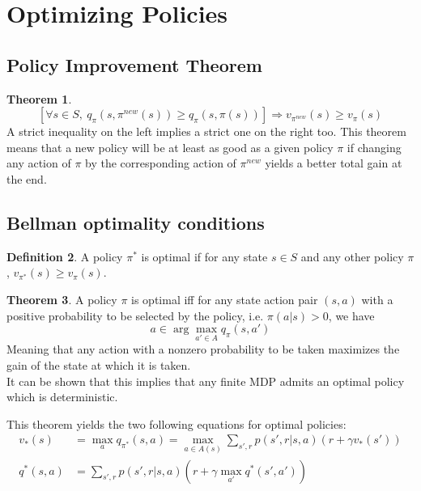 \documentclass[12pt, openany]{report}
\theoremstyle{definition}
\newtheorem{thm}{Theorem}[chapter]
\newtheorem{definition}[thm]{Definition}
\begin{document}
\section{Optimizing Policies}
\subsection{Policy Improvement Theorem}
\begin{thm}
	\begin{equation}
		\left[\forall s\in S,\ q_\pi(s,\pi^{new}(s)) \ge q_\pi(s,\pi(s)) \right] \Longrightarrow v_{\pi^{new}}(s)\ge v_\pi(s)
	\end{equation}
	A strict inequality on the left implies a strict one on the right too. This theorem means that a new policy will be at least as good as a given policy $\pi$ if changing any action of $\pi$ by the corresponding action of $\pi^{new}$ yields a better total gain at the end. 
\end{thm}
\subsection{Bellman optimality conditions}
\begin{definition}
	A policy $\pi^*$ is optimal if for any state $s \in S$ and any other policy $\pi$, $v_{\pi^*}(s)\ge v_\pi (s)$.
\end{definition}
\begin{thm}
	A policy $\pi$ is optimal iff for any state action pair $(s,a)$ with a positive probability to be selected by the policy, i.e. $\pi(a|s)>0$, we have 
	\begin{equation}
		a\in \arg\max_{a'\in A}q_\pi(s,a')
	\end{equation}
	Meaning that any action with a nonzero probability to be taken maximizes the gain of the state at which it is taken.\\
	It can be shown that this implies that any finite MDP admits an optimal policy which is deterministic. 
\end{thm}
This theorem yields the two following equations for optimal policies:
\begin{equation}\label{eq:bellman2}
	\begin{aligned}
		v_*(s) &= \max_a q_{\pi^*}(s,a) = \max_{a\in A(s)}\sum_{s',r}p(s',r|s,a)(r+\gamma v_*(s'))\\
		q^*(s,a) &= \sum_{s',r}p(s',r|s,a)(r+\gamma \max_{a'}q^*(s',a'))
	\end{aligned}
\end{equation}
\end{document}
